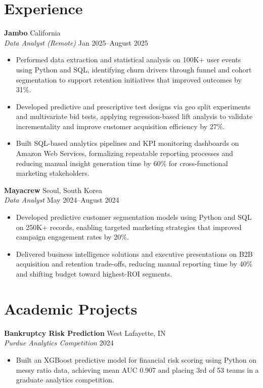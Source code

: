 \documentclass[11pt,a4paper]{article}
\begin{document}
\section*{Experience}
\noindent
\textbf{Jambo} \hfill California \\
\textit{Data Analyst (Remote)} \hfill Jan 2025--August 2025
\begin{itemize}[leftmargin=*, noitemsep, topsep=0pt]
    \item Performed data extraction and statistical analysis on 100K+ user events using Python and SQL, identifying churn drivers through funnel and cohort segmentation to support retention initiatives that improved outcomes by 31\%.
    \item Developed predictive and prescriptive test designs via geo split experiments and multivariate bid tests, applying regression-based lift analysis to validate incrementality and improve customer acquisition efficiency by 27\%.
    \item Built SQL-based analytics pipelines and KPI monitoring dashboards on Amazon Web Services, formalizing repeatable reporting processes and reducing manual insight generation time by 60\% for cross-functional marketing stakeholders.
\end{itemize}
\vspace{6pt}

\noindent
\textbf{Mayacrew} \hfill Seoul, South Korea \\
\textit{Data Analyst} \hfill May 2024--August 2024
\begin{itemize}[leftmargin=*, noitemsep, topsep=0pt]
    \item Developed predictive customer segmentation models using Python and SQL on 250K+ records, enabling targeted marketing strategies that improved campaign engagement rates by 20\%.
    \item Delivered business intelligence solutions and executive presentations on B2B acquisition and retention trade-offs, reducing manual reporting time by 40\% and shifting budget toward highest-ROI segments.
\end{itemize}

\section*{Academic Projects}
\noindent
\textbf{Bankruptcy Risk Prediction} \hfill West Lafayette, IN \\
\textit{Purdue Analytics Competition} \hfill 2024
\begin{itemize}[leftmargin=*, noitemsep, topsep=0pt]
    \item Built an XGBoost predictive model for financial risk scoring using Python on messy ratio data, achieving mean AUC 0.907 and placing 3rd of 53 teams in a graduate analytics competition.
\end{itemize}
\vspace{6pt}
\end{document}
